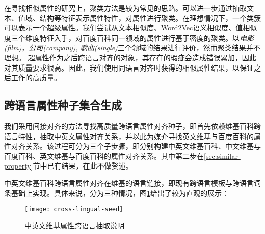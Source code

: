 在寻找相似属性的研究上，聚类方法是较为常见的思路。可以进一步通过抽取文本、值域、结构等特征表示属性特性，对属性进行聚类。在理想情况下，一个类簇可以表示一个超级属性。我们尝试从文本相似度、Word2Vec语义相似度、值相似度三个维度特征入手，对百度百科同一领域的属性进行基于密度的聚类。以\textit{电影(film)}，\textit{公司(company)}, \textit{歌曲(single)}三个领域的结果进行评价，然而聚类结果并不理想。
超属性作为之后跨语言对齐的对象，其存在的瑕疵会造成错误累加，因此对其质量要求很高。因此，我们使用同语言对齐时获得的相似属性结果，以保证之后工作的高质量。

\subsection{跨语言属性种子集合生成}
\label{sec:cross-lingual-seed}
我们采用间接对齐的方法寻找高质量跨语言属性对齐种子，即首先依赖维基百科跨语言特性，抽取中英文属性对齐关系，并以此为媒介寻找英文维基与百度百科的属性对齐关系。该过程可分为三个子步骤，即分别构建中英文维基百科、中文维基与百度百科、英文维基与百度百科的属性对齐关系。其中第二步在\ref{sec:similar-property}节中已有结果，在此不做赘述。

{\heiti 中英文维基百科跨语言属性对齐}在维基的语言链接，即现有跨语言模板与跨语言词条基础上实现。具体来说，分为三种情况，图\ref{fig:cross-lingual-seed}给出了较为直观的展示：

\begin{figure}[h]
  \centering
    \texttt{[image: cross-lingual-seed]}
  \caption{中英文维基属性跨语言抽取说明}
  \label{fig:cross-lingual-seed}
\end{figure}

